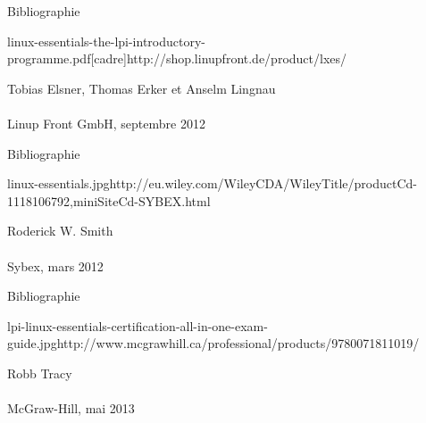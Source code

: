 \begin{frame}{Bibliographie}

\begin{bibliographie}{linux-essentials-the-lpi-introductory-programme.pdf}[cadre]{http://shop.linupfront.de/product/lxes/}

Tobias Elsner, Thomas Erker et Anselm Lingnau				\\
	\\
Linup Front GmbH, septembre 2012

\end{bibliographie}

\end{frame}


\begin{frame}{Bibliographie}

\begin{bibliographie}{linux-essentials.jpg}{http://eu.wiley.com/WileyCDA/WileyTitle/productCd-1118106792,miniSiteCd-SYBEX.html}

Roderick W. Smith			\\
	\\
Sybex, mars 2012

\end{bibliographie}

\end{frame}


\begin{frame}{Bibliographie}

\begin{bibliographie}{lpi-linux-essentials-certification-all-in-one-exam-guide.jpg}{http://www.mcgrawhill.ca/professional/products/9780071811019/}

Robb Tracy						\\
				\\
McGraw-Hill, mai 2013

\end{bibliographie}

\end{frame}
